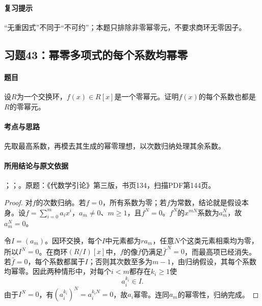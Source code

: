 \paragraph{复习提示}

“无重因式”不同于“不可约”；本题只排除非零幂零元，不要求商环无零因子。



\subsection{习题43：幂零多项式的每个系数均幂零}

\label{ex:3:43}

\paragraph{题目}

设$R$为一个交换环，$f(x)\in R[x]$是一个零幂元。证明$f(x)$的每个系数也都是$R$的零幂元。

\paragraph{考点与思路}

先取最高系数，再模去其生成的幂零理想，以次数归纳处理其余系数。

\paragraph{所用结论与原文依据}

；；。原题：《代数学引论》第三版，书页134，扫描PDF第144页。


\begin{proof}

对$f$的次数归纳。若$f=0$，所有系数为零；若$f$为常数，结论就是假设本身。设$f=\sum_{i=0}^m a_ix^i$，$a_m\ne0$、$m\ge1$，且$f^N=0$。$f^N$的$x^{mN}$系数为$a_m^N$，故$a_m^N=0$。

令$I=(a_m)$。因环交换，每个$I$中元素都为$ra_m$，任意$N$个这类元素相乘均为零，所以$I^N=0$。在商环$(R/I)[x]$中，$f$的像$\bar f$仍满足$\bar f^{\,N}=0$，而最高项已经消失。若$\bar f=0$，每个系数都属于$I$；否则其次数至多为$m-1$，由归纳假设，其每个系数均幂零。因此两种情形中，对每个$i<m$都存在$k_i\ge1$使
\[
a_i^{k_i}\in I.
\]
由于$I^N=0$，有$(a_i^{k_i})^N=a_i^{k_iN}=0$，故$a_i$幂零。连同$a_m$的幂零性，归纳完成。

\end{proof}

